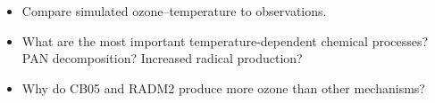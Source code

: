 \begin{BlueBox}
    \vskip-1cm
    \begin{block}{}
        \begin{itemize}
            \item Compare simulated ozone--temperature to observations. \vspace{15mm}
            \item What are the most important temperature-dependent chemical processes? PAN decomposition? Increased radical production? \vspace{15mm}
            \item Why do CB05 and RADM2 produce more ozone than other mechanisms? \vspace{15mm}
        \end{itemize}        
    \end{block}
\end{BlueBox}
